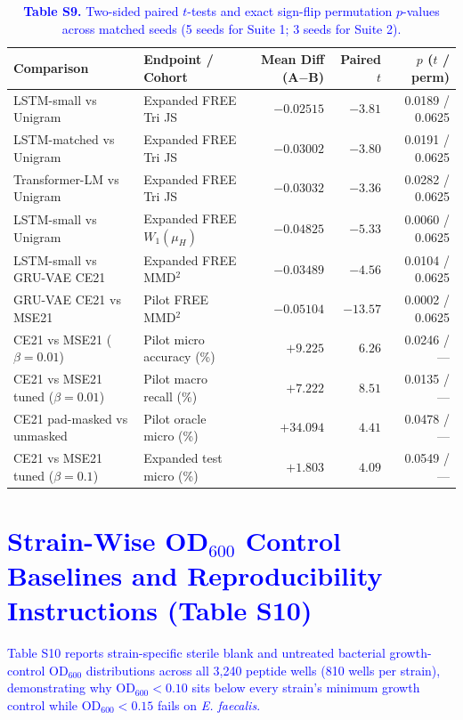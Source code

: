 \documentclass[11pt,a4paper]{article}
\newcommand{\rev}[1]{\textcolor{blue}{#1}}
\begin{document}
\begin{table}[H]
\centering\footnotesize
\caption*{\rev{\textbf{Table S9.} Two-sided paired $t$-tests and exact sign-flip permutation $p$-values across matched seeds (5 seeds for Suite 1; 3 seeds for Suite 2).}}
\begin{tabular}{llrrr}
\toprule
Comparison & Endpoint / Cohort & Mean Diff (A$-$B) & Paired $t$ & $p$ ($t$ / perm) \\
\midrule
LSTM-small vs Unigram & Expanded FREE Tri JS & $-0.02515$ & $-3.81$ & 0.0189 / 0.0625 \\
LSTM-matched vs Unigram & Expanded FREE Tri JS & $-0.03002$ & $-3.80$ & 0.0191 / 0.0625 \\
Transformer-LM vs Unigram & Expanded FREE Tri JS & $-0.03032$ & $-3.36$ & 0.0282 / 0.0625 \\
LSTM-small vs Unigram & Expanded FREE $W_1(\mu_H)$ & $-0.04825$ & $-5.33$ & 0.0060 / 0.0625 \\
LSTM-small vs GRU-VAE CE21 & Expanded FREE MMD$^2$ & $-0.03489$ & $-4.56$ & 0.0104 / 0.0625 \\
GRU-VAE CE21 vs MSE21 & Pilot FREE MMD$^2$ & $-0.05104$ & $-13.57$ & 0.0002 / 0.0625 \\
CE21 vs MSE21 ($\beta=0.01$) & Pilot micro accuracy (\%) & $+9.225$ & $6.26$ & 0.0246 / --- \\
CE21 vs MSE21 tuned ($\beta=0.01$) & Pilot macro recall (\%) & $+7.222$ & $8.51$ & 0.0135 / --- \\
CE21 pad-masked vs unmasked & Pilot oracle micro (\%) & $+34.094$ & $4.41$ & 0.0478 / --- \\
CE21 vs MSE21 tuned ($\beta=0.1$) & Expanded test micro (\%) & $+1.803$ & $4.09$ & 0.0549 / --- \\
\bottomrule
\end{tabular}
\end{table}

\FloatBarrier
\section{\rev{Strain-Wise OD$_{600}$ Control Baselines and Reproducibility Instructions (Table S10)}}
\rev{Table S10 reports strain-specific sterile blank and untreated bacterial growth-control OD$_{600}$ distributions across all 3,240 peptide wells (810 wells per strain), demonstrating why OD$_{600}<0.10$ sits below every strain's minimum growth control while OD$_{600}<0.15$ fails on \textit{E. faecalis}.}
\end{document}
